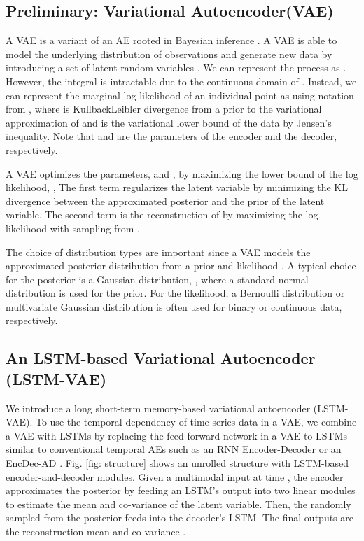 \documentclass[letterpaper, 10 pt, conference]{ieeeconf}
\begin{document}
\subsection{Preliminary: Variational Autoencoder(VAE)}
A VAE is a variant of an AE rooted in Bayesian inference \cite{kingma2013auto}. A VAE is able to model the underlying distribution of observations  and generate new data by introducing a set of latent random variables . We can represent the process as . However, the integral is intractable due to the continuous domain of . Instead, we can represent the marginal log-likelihood of an individual point as  using notation from \cite{kingma2013auto}, where  is Kullback\-Leibler divergence from a prior  to the variational approximation  of  and  is the variational lower bound of the data  by Jensen's inequality. Note that  and  are the parameters of the encoder and the decoder, respectively.

A VAE optimizes the parameters,  and , by maximizing the lower bound of the log likelihood, ,
The first term regularizes the latent variable  by minimizing the KL divergence between the approximated posterior and the prior of the latent variable. The second term is the reconstruction of  by maximizing the log-likelihood  with sampling from . 

The choice of distribution types are important since a VAE models the approximated posterior distribution  from a prior  and likelihood . A typical choice for the posterior is a Gaussian distribution, , where a standard normal distribution  is used for the prior. For the likelihood, a Bernoulli distribution or multivariate Gaussian distribution is often used for binary or continuous data, respectively.


\subsection{An LSTM-based Variational Autoencoder (LSTM-VAE)} \label{ss_lstm_vae}
We introduce a long short-term memory-based variational autoencoder (LSTM-VAE). To use the temporal dependency of time-series data in a VAE, we combine a VAE with LSTMs by replacing the feed-forward network in a VAE to LSTMs similar to conventional temporal AEs such as an RNN Encoder-Decoder \cite{cho2014learning} or an EncDec-AD \cite{malhotra2016lstm}. Fig. \ref{fig: structure} shows an unrolled structure with LSTM-based encoder-and-decoder modules. Given a multimodal input  at time , the encoder approximates the posterior  by feeding an LSTM's output into two linear modules to estimate the mean  and co-variance  of the latent variable. Then, the randomly sampled  from the posterior  feeds into the decoder's LSTM. The final outputs are the reconstruction mean  and co-variance . 
\end{document}
